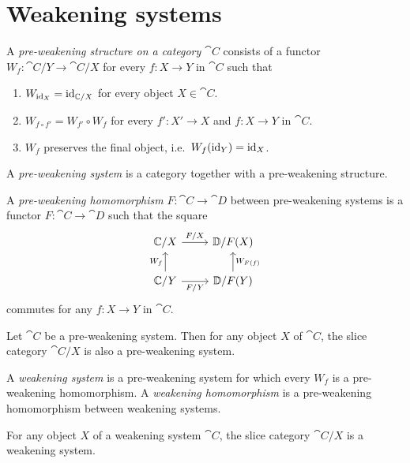 \section{Weakening systems}

\begin{defn}
A \emph{pre-weakening structure on a category $\cat{C}$} consists of a functor
$W_f:\cat{C}/Y\to \cat{C}/X$ for every $f:X\to Y$ in $\cat{C}$ such 
that
\begin{enumerate}
\item $W_{{\mathrm{id}_{X}}}={\mathrm{id}_{\mathbb{C}/X}}$ for every object $X\in\cat{C}$.
\item $W_{f\circ f'}=W_{f'}\circ W_f$ for every $f':X'\to X$ and $f:X\to Y$ in
$\cat{C}$.
\item $W_f$ preserves the final object, i.e.~$W_f({\mathrm{id}_{Y}})={\mathrm{id}_{X}}$.
\end{enumerate}
A \emph{pre-weakening system} is a category together with a pre-weakening structure.
\end{defn}

\begin{defn}
A \emph{pre-weakening homomorphism} $F:\cat{C}\to\cat{D}$ between pre-weakening systems
is a functor $F:\cat{C}\to\cat{D}$ such that the square
\begin{equation*}
\begin{tikzcd}
\cat{C}/X
  \arrow[r,"F/X"]
  &
\cat{D}/F(X)
  \\
\cat{C}/Y
  \arrow[u,"W_f"]
  \arrow[r,swap,"F/Y"]
  &
\cat{D}/F(Y)
  \arrow[u,swap,"W_{F(f)}"]
\end{tikzcd}
\end{equation*}
commutes for any $f:X\to Y$ in $\cat{C}$.
\end{defn}

\begin{lem}
Let $\cat{C}$ be a pre-weakening system. Then for any object $X$ of $\cat{C}$,
the slice category $\cat{C}/X$ is also a pre-weakening system.
\end{lem}

\begin{defn}
A \emph{weakening system} is a pre-weakening system for which every $W_f$ is a
pre-weakening homomorphism. A \emph{weakening homomorphism} is a pre-weakening 
homomorphism between weakening systems.
\end{defn}

\begin{cor}
For any object $X$ of a weakening system $\cat{C}$, the slice category
$\cat{C}/X$ is a weakening system.
\end{cor}

